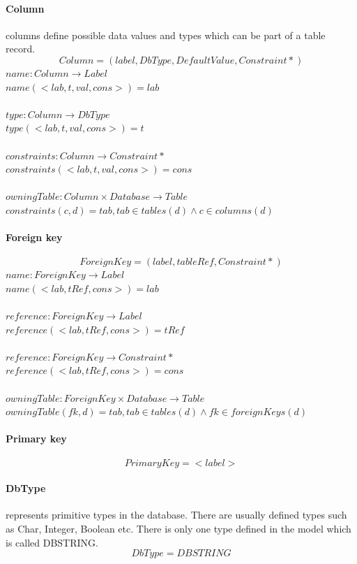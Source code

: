 \documentclass[11pt]{article}
\begin{document}
\paragraph{Column} columns define possible data values and types which can be part of a table record.
$$
Column = (label, DbType, DefaultValue, Constraint*)
$$
$name : Column \rightarrow Label $ \\
$name(< lab, t, val, cons  >) = lab $ \\ \\
$type : Column \rightarrow DbType $ \\
$type(< lab, t, val, cons  >) = t $ \\ \\
$constraints : Column \rightarrow Constraint* $ \\
$constraints(< lab, t, val, cons  >) = cons $ \\ \\
$owningTable : Column \times Database \rightarrow Table $ \\
$constraints(c, d) = tab, tab \in tables(d) \wedge c \in columns(d) $

\paragraph{Foreign key}
$$
ForeignKey = (label, tableRef, Constraint*)
$$
$name : ForeignKey \rightarrow Label $ \\
$name(< lab, tRef, cons  >) = lab $ \\ \\
$reference : ForeignKey \rightarrow Label $ \\
$reference(< lab, tRef, cons  >) = tRef $ \\ \\
$reference : ForeignKey \rightarrow Constraint* $ \\
$reference(< lab, tRef, cons  >) = cons $ \\ \\
$owningTable : ForeignKey \times Database \rightarrow Table $ \\
$owningTable(fk, d) = tab, tab \in tables(d) \wedge fk \in foreignKeys(d) $

\paragraph{Primary key}
$$
PrimaryKey =  < label > 	
$$

\paragraph{DbType} represents primitive types in the database. There are usually defined types such as Char, Integer, Boolean etc. There is only one type defined in the model which is called DBSTRING.
$$
DbType = DBSTRING
$$
\end{document}
